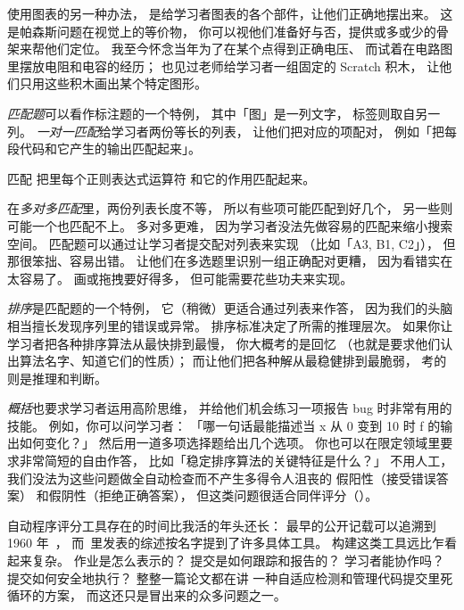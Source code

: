 
使用图表的另一种办法，
是给学习者图表的各个部件，让他们正确地摆出来。
这是帕森斯问题在视觉上的等价物，
你可以视他们准备好与否，提供或多或少的骨架来帮他们定位。
我至今怀念当年为了在某个点得到正确电压、
而试着在电路图里摆放电阻和电容的经历；
也见过老师给学习者一组固定的 Scratch 积木，
让他们只用这些积木画出某个特定图形。

\emph{匹配题}可以看作标注题的一个特例，
其中「图」是一列文字，
标签则取自另一列。
\emph{一对一匹配}给学习者两份等长的列表，
让他们把对应的项配对，
例如「把每段代码和它产生的输出匹配起来」。

\begin{aside}{匹配}
  把里每个正则表达式运算符
  和它的作用匹配起来。
\end{aside}


在\emph{多对多匹配}里，两份列表长度不等，
所以有些项可能匹配到好几个，
另一些则可能一个也匹配不上。
多对多更难，
因为学习者没法先做容易的匹配来缩小搜索空间。
匹配题可以通过让学习者提交配对列表来实现
（比如「A3, B1, C2」），
但那很笨拙、容易出错。
让他们在多选题里识别一组正确配对更糟，
因为看错实在太容易了。
画或拖拽要好得多，
但可能需要花些功夫来实现。

\emph{排序}是匹配题的一个特例，
它（稍微）更适合通过列表来作答，
因为我们的头脑相当擅长发现序列里的错误或异常。
排序标准决定了所需的推理层次。
如果你让学习者把各种排序算法从最快排到最慢，
你大概考的是回忆
（也就是要求他们认出算法名字、知道它们的性质）；
而让他们把各种解从最稳健排到最脆弱，
考的则是推理和判断。

\emph{概括}也要求学习者运用高阶思维，
并给他们机会练习一项报告 bug 时非常有用的技能。
例如，你可以问学习者：
「哪一句话最能描述当 x 从 0 变到 10 时 f 的输出如何变化？」
然后用一道多项选择题给出几个选项。
你也可以在限定领域里要求非常简短的自由作答，
比如「稳定排序算法的关键特征是什么？」
不用人工，我们没法为这些问题做全自动检查而不产生多得令人沮丧的
假阳性（接受错误答案）
和假阴性（拒绝正确答案），
但这类问题很适合同伴评分（）。


自动程序评分工具存在的时间比我活的年头还长：
最早的公开记载可以追溯到 1960 年~\cite{Holl1960}，
而~\cite{Douc2005,Ihan2010}里发表的综述按名字提到了许多具体工具。
构建这类工具远比乍看起来复杂。
作业是怎么表示的？
提交是如何跟踪和报告的？
学习者能协作吗？
提交如何安全地执行？
\cite{Edwa2014a}整整一篇论文都在讲
一种自适应检测和管理代码提交里死循环的方案，
而这还只是冒出来的众多问题之一。

